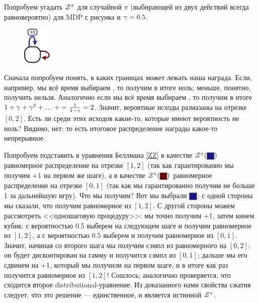 \begin{example}
Попробуем угадать $\mathcal{Z}^{\pi}$ для случайной $\pi$ (выбирающей из двух действий всегда равновероятно) для MDP с рисунка и $\gamma \HM = 0.5$.

\begin{figure}
\vspace{-0.5cm}
\centering
\includegraphics[width=0.12\textwidth]{Images/DistributionalExample.png}
\vspace{-0.3cm}
\end{figure}

Сначала попробуем понять, в каких границах может лежать наша награда. Если, например, мы всё время выбираем , то получим в итоге ноль; меньше, понятно, получить нельзя. Аналогично если мы всё время выбираем , то получим в итоге $1 \HM+ \gamma \HM+ \gamma^2 \HM+ \dots \HM+ \HM= \frac{1}{1 - \gamma} \HM= 2$. Значит, вероятные исходы размазаны на отрезке $[0, 2]$. Есть ли среди этих исходов какие-то, которые имеют вероятность не ноль? Видимо, нет: то есть итоговое распределение награды какое-то непрерывное.

Попробуем подставить в уравнения Беллмана \eqref{ZZ} в качестве $\Z^{\pi}(\text{\colorsquare{ChadBlue}})$ равномерное распределение на отрезке $[1, 2]$ (так как гарантированно мы получим +1 на первом же шаге), а в качестве $\Z^{\pi}(\text{\colorsquare{ChadRed}})$ равномерное распределение на отрезке $[0, 1]$ (так как мы гарантированно получим не больше 1 за дальнейшую игру). Что мы получим? Вот мы выбрали $\colorsquare{ChadBlue}$: с одной стороны мы сказали, что получим равномерное из $[1, 2]$. С другой стороны можем рассмотреть <<одношаговую процедуру>>: мы точно получим +1, затем кинем кубик: с вероятностью 0.5 выберем на следующем шаге  и получим равномерное из $[1, 2]$, а с вероятностью 0.5 выберем  и получим равномерное из $[0, 1]$. Значит, начиная со второго шага мы получим сэмпл из равномерного на $[0, 2]$; он будет дисконтирован на гамму и получится сэмпл из $[0, 1]$; дальше мы его сдвинем на +1, который мы получили на первом шаге, и в итоге как раз получится равномерное из $[1, 2]$! Сошлось; аналогично проверяется, что сходится второе distributional-уравнение. Из доказанного нами свойства сжатия следует, что это решение --- единственное, и является истинной $\mathcal{Z}^{\pi}$. 
\end{example}

